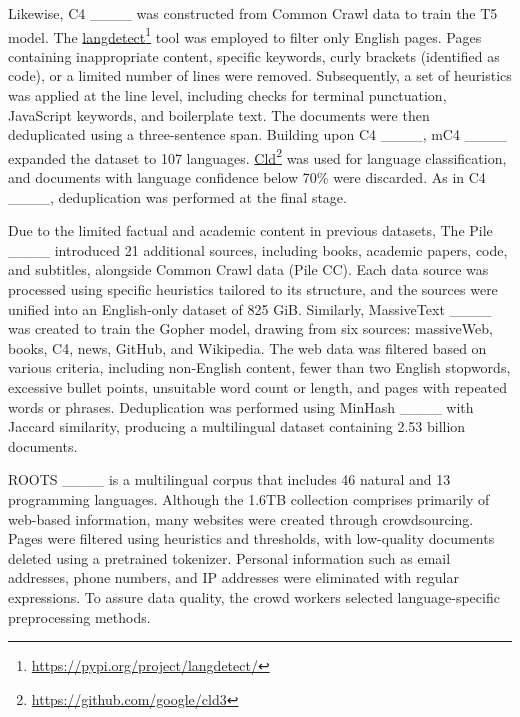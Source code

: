 Likewise, C4 ____ was constructed from Common Crawl data to train the T5 model. The \href{https://pypi.org/project/langdetect/}{langdetect}\footnote{\href{https://pypi.org/project/langdetect/}{https://pypi.org/project/langdetect/}} tool was employed to filter only English pages. Pages containing inappropriate content, specific keywords, curly brackets (identified as code), or a limited number of lines were removed. Subsequently, a set of heuristics was applied at the line level, including checks for terminal punctuation, JavaScript keywords, and boilerplate text. The documents were then deduplicated using a three-sentence span. Building upon C4 ____, mC4 ____ expanded the dataset to 107 languages. \href{https://github.com/google/cld3}{Cld}\footnote{\href{https://github.com/google/cld3}{https://github.com/google/cld3}} was used for language classification, and documents with language confidence below 70\% were discarded. As in C4 ____, deduplication was performed at the final stage.

Due to the limited factual and academic content in previous datasets, The Pile ____ introduced 21 additional sources, including books, academic papers, code, and subtitles, alongside Common Crawl data (Pile CC). Each data source was processed using specific heuristics tailored to its structure, and the sources were unified into an English-only dataset of 825 GiB. Similarly, MassiveText ____ was created to train the Gopher model, drawing from six sources: massiveWeb, books, C4, news, GitHub, and Wikipedia. The web data was filtered based on various criteria, including non-English content, fewer than two English stopwords, excessive bullet points, unsuitable word count or length, and pages with repeated words or phrases. Deduplication was performed using MinHash ____ with Jaccard similarity, producing a multilingual dataset containing 2.53 billion documents.

ROOTS ____ is a multilingual corpus that includes 46 natural and 13 programming languages. Although the 1.6TB collection comprises primarily of web-based information, many websites were created through crowdsourcing. Pages were filtered using heuristics and thresholds, with low-quality documents deleted using a pretrained tokenizer. Personal information such as email addresses, phone numbers, and IP addresses were eliminated with regular expressions. To assure data quality, the crowd workers selected language-specific preprocessing methods.

